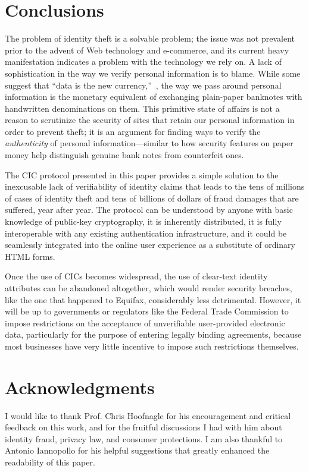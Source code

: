 \documentclass[conference]{IEEEtran}
\begin{document}
\section{Conclusions}
The problem of identity theft is a solvable problem; the issue was not prevalent prior
to the advent of Web technology and e-commerce, and its current heavy manifestation 
indicates a problem with the technology we rely on. A lack of sophistication in the way
we verify personal information is to blame. While some suggest that ``data is the 
new currency,''~\cite{gates2014data}, the way we pass around personal information is the 
monetary equivalent of exchanging plain-paper banknotes with handwritten 
denominations on them. This primitive state of affairs is not a reason to scrutinize the security of sites that retain our personal information in order to prevent theft; it is an argument for finding ways to verify the \emph{authenticity} of personal information---similar to how security features on paper money help distinguish genuine bank notes from counterfeit ones. 

The CIC protocol presented in this paper provides a simple solution to the
inexcusable lack of verifiability of identity claims that leads to the tens
of millions of cases of identity theft and tens of billions of dollars of 
fraud damages that are suffered, year after year. The protocol can be 
understood by anyone with basic knowledge of public-key cryptography, it
is inherently distributed, it is fully interoperable with any existing
authentication infrastructure, and it could be seamlessly integrated 
into the online user experience as a substitute of ordinary HTML forms.

Once the use of CICs becomes widespread, the use of clear-text 
identity attributes can be abandoned altogether, which would render 
security breaches, like the one that happened to Equifax, considerably 
less detrimental.
However, it will be up to governments or regulators like the Federal Trade 
Commission to impose restrictions on the acceptance of unverifiable
user-provided electronic data, particularly for the purpose of 
entering legally binding agreements, because most businesses have 
very little incentive to impose such restrictions themselves.

\section*{Acknowledgments}
I would like to thank Prof. Chris Hoofnagle for his encouragement and critical feedback on this work, and for the fruitful discussions I had with him about identity fraud, privacy law, and consumer protections. I am also thankful to Antonio Iannopollo for his helpful suggestions that greatly enhanced the readability of this paper.




\end{document}
